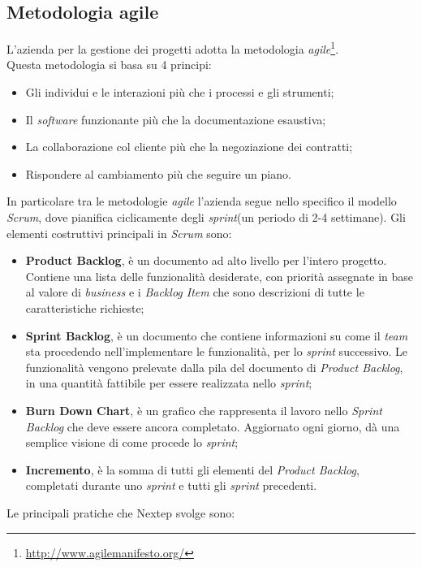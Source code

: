 \subsection{Metodologia agile}
L'azienda per la gestione dei progetti adotta la metodologia \emph{agile}\footnote{\url{http://www.agilemanifesto.org/}}.\\Questa metodologia si basa su 4 principi:
\begin{itemize}
\item Gli individui e le interazioni più che i processi e gli strumenti;
\item Il \emph{software} funzionante più che la documentazione esaustiva;
\item La collaborazione col cliente più che la negoziazione dei contratti;
\item Rispondere al cambiamento più che seguire un piano.
\end{itemize}
In particolare tra le metodologie \emph{agile} l'azienda segue nello specifico il modello \emph{Scrum}, dove pianifica ciclicamente degli \emph{sprint}(un periodo di 2-4 settimane).
\newpage
Gli elementi costruttivi principali in \emph{Scrum} sono:
\begin{itemize}
\item \textbf{Product Backlog}, è un documento ad alto livello per l'intero progetto. Contiene una lista delle funzionalità desiderate, con priorità assegnate in base al valore di \emph{business} e  i \emph{Backlog Item} che sono descrizioni di tutte le caratteristiche richieste;
\item \textbf{Sprint Backlog}, è un documento che contiene informazioni su come il \emph{team} sta procedendo nell'implementare le funzionalità, per lo \emph{sprint} successivo. Le funzionalità vengono prelevate dalla pila del documento di \emph{Product Backlog}, in una quantità fattibile per essere realizzata nello \emph{sprint};
\item \textbf{Burn Down Chart}, è un grafico che rappresenta il lavoro nello \emph{Sprint Backlog} che deve essere ancora completato. Aggiornato ogni giorno, dà una semplice visione di come procede lo \emph{sprint};
\item \textbf{Incremento}, è la somma di tutti gli elementi del \emph{Product Backlog}, completati durante uno \emph{sprint} e tutti gli \emph{sprint} precedenti.
\end{itemize}
Le principali pratiche che Nextep svolge sono:
